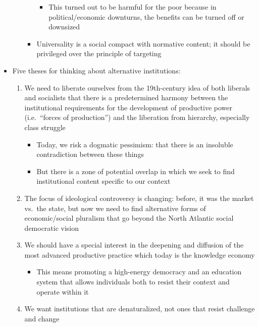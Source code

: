 \begin{itemize}
\begin{itemize}
\begin{itemize}
      \begin{itemize}
      \tightlist
      \item
        This turned out to be harmful for the poor because in
        political/economic downturns, the benefits can be turned off or
        downsized
      \end{itemize}
    \item
      Universality is a social compact with normative content; it should
      be privileged over the principle of targeting
    \end{itemize}
  \end{itemize}
\item
  Five theses for thinking about alternative institutions:

  \begin{enumerate}
  \def\labelenumi{\arabic{enumi}.}
  \tightlist
  \item
    We need to liberate ourselves from the 19th-century idea of both
    liberals and socialists that there is a predetermined harmony
    between the institutional requirements for the development of
    productive power (i.e.~``forces of production'') and the liberation
    from hierarchy, especially class struggle

    \begin{itemize}
    \tightlist
    \item
      Today, we risk a dogmatic pessimism: that there is an insoluble
      contradiction between these things
    \item
      But there is a zone of potential overlap in which we seek to find
      institutional content specific to our context
    \end{itemize}
  \item
    The focus of ideological controversy is changing: before, it was the
    market vs.~the state, but now we need to find alternative forms of
    economic/social pluralism that go beyond the North Atlantic social
    democratic vision
  \item
    We should have a special interest in the deepening and diffusion of
    the most advanced productive practice which today is the knowledge
    economy

    \begin{itemize}
    \tightlist
    \item
      This means promoting a high-energy democracy and an education
      system that allows individuals both to resist their context and
      operate within it
    \end{itemize}
  \item
    We want institutions that are denaturalized, not ones that resist
    challenge and change


\end{enumerate}
\end{itemize}
